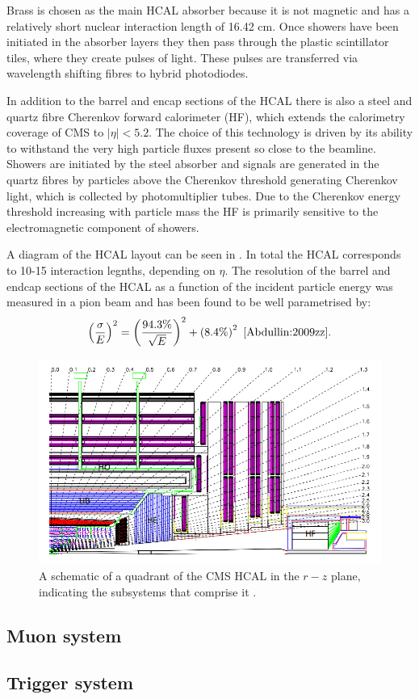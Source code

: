 Brass is chosen as the main \ac{HCAL} absorber because it is not magnetic and has a relatively short nuclear interaction length of 16.42 cm. Once showers have been initiated in the absorber layers they then pass through the plastic scintillator tiles, where they create pulses of light. These pulses are transferred via wavelength shifting fibres to hybrid photodiodes. %

In addition to the barrel and encap sections of the \ac{HCAL} there is also a steel and quartz fibre Cherenkov forward calorimeter (\ac{HF}), which extends the calorimetry coverage of CMS to $|\eta|<5.2$. The choice of this technology is driven by its ability to withstand the very high particle fluxes present so close to the beamline. Showers are initiated by the steel absorber and signals are generated in the quartz fibres by particles above the Cherenkov threshold generating Cherenkov light, which is collected by photomultiplier tubes. Due to the Cherenkov energy threshold increasing with particle mass the \ac{HF} is primarily sensitive to the electromagnetic component of showers.

A diagram of the \ac{HCAL} layout can be seen in . In total the \ac{HCAL} corresponds to 10-15 interaction legnths, depending on $\eta$. The resolution of the barrel and endcap sections of the \ac{HCAL} as a function of the incident particle energy was measured in a pion beam and has been found to be well parametrised by:
\begin{equation} 
  \label{eq:hcalres}
  \left(\frac{\sigma}{E}\right)^{2}=\left(\frac{94.3\%}{\sqrt{E}}\right)^{2}+\left(8.4\%\right)^{2}~\cite{Abdullin:2009zz}.
\end{equation}

\begin{figure}
  \includegraphics[width=1.2\largefigwidth]{plots/detector/hcal_layout1.png}
  \caption{A schematic of a quadrant of the CMS \ac{HCAL} in the $r-z$ plane, indicating the subsystems that comprise it \cite{Chatrchyan:2008aa}.}
  \label{fig:hcalschematic}
\end{figure}

\subsection{Muon system}

\subsection{Trigger system}
\label{sec:triggers}
